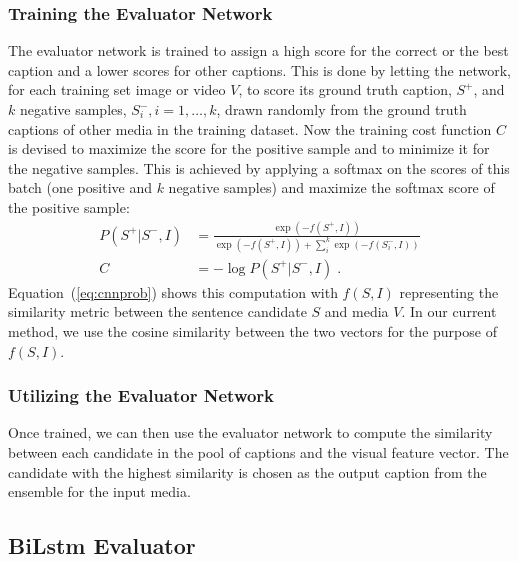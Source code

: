 
\subsubsection{Training the Evaluator Network}

The evaluator network is trained to assign a high score for the correct or the
best caption and a lower scores for other captions.
This is done by letting the network, for each training set image or video $V$,
to score its ground truth caption, $S^+$, and $k$ negative samples, $S_i^-,
i=1,\ldots,k$, drawn randomly from the ground truth captions of other media in
the training dataset.
Now the training cost function $C$ is devised to maximize the score for the
positive sample and to minimize it for the negative samples. 
This is achieved by applying a softmax on the scores of this batch (one positive
and $k$ negative samples) and maximize the softmax score
of the positive sample:
\begin{align}
  \label{eq:cnnprob} 
  P(S^+|S^-,I) &= \frac{\exp(-f(S^+,I))}{\exp(-f(S^+,I)) +
           \sum\limits_i^k{\exp(-f(S_i^- ,I))}} \\
  C &= -\log P(S^+|S^-,I) \;.
\end{align}
Equation~(\ref{eq:cnnprob}) shows this computation with $f(S,I)$ representing
the similarity metric between the sentence candidate $S$ and media $V$.
In our current method, we use the cosine similarity between the two vectors for
the purpose of $f(S,I)$.


\subsubsection{Utilizing the Evaluator Network}

Once trained, we can then use the evaluator network to compute the similarity
between each candidate in the pool of captions and the visual feature vector. 
The candidate with the highest similarity is chosen as the output caption from
the ensemble for the input media.

\subsection{BiLstm Evaluator}

